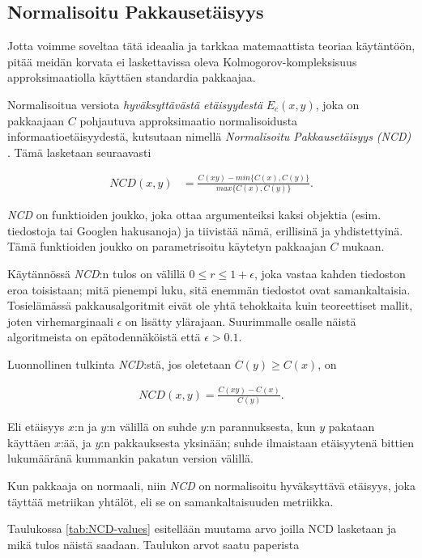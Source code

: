 \documentclass[12pt,finnish]{tktltiki2}
\theoremstyle{definition}
\theoremstyle{remark}
\begin{document}
\subsection{Normalisoitu Pakkausetäisyys} %
\label{sub:normalisoitu_pakkausetaisyys}

  Jotta voimme soveltaa tätä ideaalia ja tarkkaa matemaattista teoriaa käytäntöön, pitää meidän korvata ei laskettavissa oleva Kolmogorov-kompleksisuus approksimaatiolla käyttäen standardia pakkaajaa.

  Normalisoitua versiota \emph{hyväksyttävästä etäisyydestä} $E_c(x,y)$, joka on pakkaajaan $C$ pohjautuva approksimaatio normalisoidusta informaatioetäisyydestä, kutsutaan nimellä \emph{Normalisoitu Pakkausetäisyys (NCD)} \cite{CV05}.
  Tämä lasketaan seuraavasti

  \begin{align}
    NCD(x,y) &= \frac{C(xy)-min\{C(x),C(y)\}}{max\{C(x),C(y)\}}.
  \end{align}

  \emph{NCD} on funktioiden joukko, joka ottaa argumenteiksi kaksi objektia (esim. tiedostoja tai Googlen hakusanoja) ja tiivistää nämä, erillisinä ja yhdistettyinä.
  Tämä funktioiden joukko on parametrisoitu käytetyn pakkaajan $C$ mukaan.

  Käytännössä \emph{NCD}:n tulos on välillä $0 \leq r \leq 1+ \epsilon$, joka vastaa kahden tiedoston eroa toisistaan; mitä pienempi luku, sitä enemmän tiedostot ovat samankaltaisia.
  Tosielämässä pakkausalgoritmit eivät ole yhtä tehokkaita kuin teoreettiset mallit, joten virhemarginaali $\epsilon$ on lisätty ylärajaan.
  Suurimmalle osalle näistä algoritmeista on epätodennäköistä että  $\epsilon > 0.1$.

  Luonnollinen tulkinta \emph{NCD}:stä, jos oletetaan $C(y) \geq C(x)$, on

  \begin{align}
    NCD(x,y) = \frac{C(xy)-C(x)}{C(y)}.
  \end{align}

  Eli etäisyys $x$:n ja $y$:n välillä on suhde $y$:n parannuksesta, kun $y$ pakataan käyttäen $x$:ää, ja $y$:n pakkauksesta yksinään; suhde ilmaistaan etäisyytenä bittien lukumääränä kummankin pakatun version välillä.

  Kun pakkaaja on normaali, niin \emph{NCD} on normalisoitu hyväksyttävä etäisyys, joka täyttää metriikan yhtälöt, eli se on samankaltaisuuden metriikka.

  Taulukossa \ref{tab:NCD-values} esitellään muutama arvo joilla NCD lasketaan ja mikä tulos näistä saadaan. Taulukon arvot saatu paperista \cite{cebrian2005common}
\end{document}
